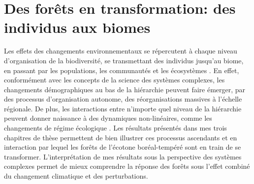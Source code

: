 \hypertarget{des-foruxeats-en-transformation-des-individus-aux-biomes}{%
\section{Des forêts en transformation: des individus aux
biomes}\label{des-foruxeats-en-transformation-des-individus-aux-biomes}}

Les effets des changements environnementaux se répercutent à chaque
niveau d'organisation de la biodiversité, se transmettant des individus
jusqu'au biome, en passant par les populations, les communautés et les
écosystèmes \citep{bellard_impacts_2012, parmesan_globally_2003}. En
effet, conformément avec les concepts de la science des systèmes
complexes, les changements démographiques au bas de la hiérarchie
peuvent faire émerger, par des processus d'organisation autonome, des
réorganisations massives à l'échelle régionale. De plus, les
interactions entre n'importe quel niveau de la hiérarchie peuvent donner
naissance à des dynamiques non-linéaires, comme les changements de
régime écologique \citep[Fig.
\ref{fig4.2};][]{filotas_viewing_2014, messier_managing_2013}. Les
résultats présentés dans mes trois chapitres de thèse permettent de bien
illustrer ces processus ascendants et en interaction par lequel les
forêts de l'écotone boréal-tempéré sont en train de se transformer.
L'interprétation de mes résultats sous la perspective des systèmes
complexes permet de mieux comprendre la réponse des forêts sous l'effet
combiné du changement climatique et des perturbations.

